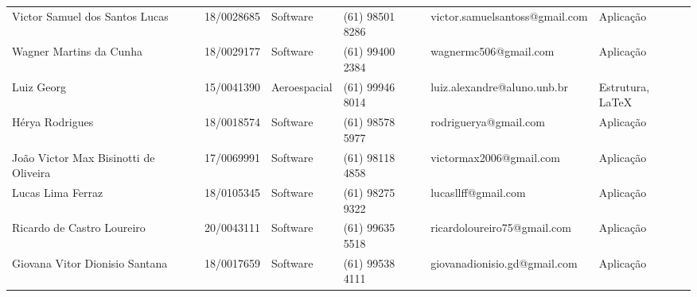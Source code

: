 \begin{landscape}
\begin{table}[h]
\begin{tabular}{llllll}
            Victor Samuel dos Santos Lucas        & 18/0028685        & Software      & (61) 98501 8286  & victor.samuelsantoss@gmail.com & Aplicação           \\
            Wagner Martins da Cunha               & 18/0029177        & Software      & (61) 99400 2384  & wagnermc506@gmail.com          & Aplicação           \\
            Luiz Georg                            & 15/0041390        & Aeroespacial  & (61) 99946 8014  & luiz.alexandre@aluno.unb.br    & Estrutura, LaTeX    \\
            Hérya Rodrigues                       & 18/0018574        & Software      & (61) 98578 5977  & rodriguerya@gmail.com          & Aplicação           \\
            João Victor Max Bisinotti de Oliveira & 17/0069991        & Software      & (61) 98118 4858  & victormax2006@gmail.com        & Aplicação           \\
            Lucas Lima Ferraz                     & 18/0105345        & Software      & (61) 98275 9322  & lucasllff@gmail.com            & Aplicação           \\
            Ricardo de Castro Loureiro            & 20/0043111        & Software      & (61) 99635 5518  & ricardoloureiro75@gmail.com    & Aplicação           \\
            Giovana Vitor Dionisio Santana        & 18/0017659        & Software      & (61) 99538 4111  & giovanadionisio.gd@gmail.com   & Aplicação           \\
            \bottomrule
        \end{tabular}
    \end{table}

    \clearpage


\end{landscape}
